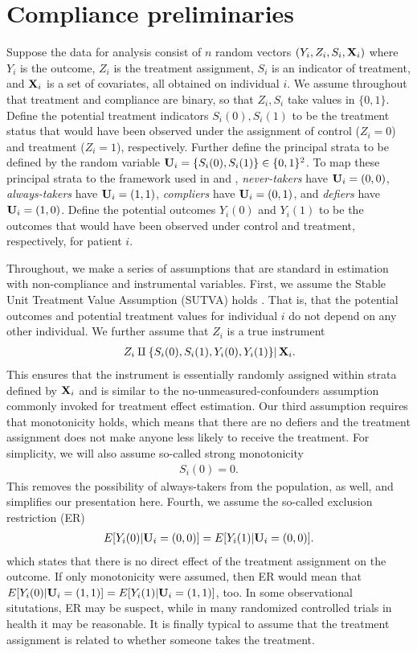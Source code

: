 \documentclass{article}
\begin{document}
\section{Compliance preliminaries}
Suppose the data for analysis consist of $n$ random vectors $(Y_i, Z_i, S_i, {\bf X}_i)$ where $Y_i$ is the outcome, $Z_i$ is the treatment assignment, $S_i$ is an indicator of treatment, and ${\bf X}_i$ is a set of covariates, all obtained on individual $i$. We assume throughout that treatment and compliance are binary, so that $Z_i, S_i$ take values in $\{0, 1\}$. Define the potential treatment indicators $S_i(0), S_i(1)$ to be the treatment status that would have been observed under the assignment of control ($Z_i = 0$) and treatment ($Z_i = 1$), respectively. Further define the principal strata to be defined by the random variable ${\bf U}_i = \{S_i(0), S_i(1)\} \in \{0,1\}^2$. To map these principal strata to the framework used in \cite{Angrist1995} and \cite{Little2018}, {\em never-takers} have ${\bf U}_i = (0, 0)$, {\em always-takers} have ${\bf U}_i = (1, 1)$, {\em compliers} have ${\bf U}_i = (0, 1)$, and {\em defiers} have ${\bf U}_i = (1, 0)$. Define the potential outcomes $Y_i(0)$ and $Y_i(1)$ to be the outcomes that would have been observed under control and treatment, respectively, for patient $i$.  

Throughout, we make a series of assumptions that are standard in estimation with non-compliance and instrumental variables. First, we assume the Stable Unit Treatment Value Assumption (SUTVA) holds \cite{rubin1978bayesian} . That is, that the potential outcomes and potential treatment values for individual $i$ do not depend on any other individual. We further assume that $Z_i$ is a true instrument
\begin{align}
    \left.Z_i \amalg \left\{S_i(0), S_i(1), Y_i(0), Y_i(1)\right\}\right|{\bf X}_i.
\end{align}
This ensures that the instrument is essentially randomly assigned within strata defined by ${\bf X}_i$ and is similar to the no-unmeasured-confounders assumption commonly invoked for treatment effect estimation. Our third assumption requires that monotonicity holds, which means that there are no defiers and the treatment assignment does not make anyone less likely to receive the treatment. For simplicity, we will also assume so-called strong monotonicity
\begin{align}
    S_i(0) = 0. \label{strong_monotonicity}
\end{align}
This removes the possibility of always-takers from the population, as well, and simplifies our presentation here. Fourth, we assume the so-called exclusion restriction (ER)
\begin{align}
    E[Y_i(0) | {\bf U}_i = (0, 0)] = E[Y_i(1) | {\bf U}_i = (0, 0)]. \label{er}
\end{align}
which states that there is no direct effect of the treatment assignment on the outcome. If only monotonicity were assumed, then ER would mean that $E[Y_i(0) | {\bf U}_i = (1, 1)] = E[Y_i(1) | {\bf U}_i = (1, 1)]$, too. In some observational situtations, ER may be suspect, while in many randomized controlled trials in health it may be reasonable. It is finally typical to assume that the treatment assignment is related to whether someone takes the treatment. 
\end{document}
